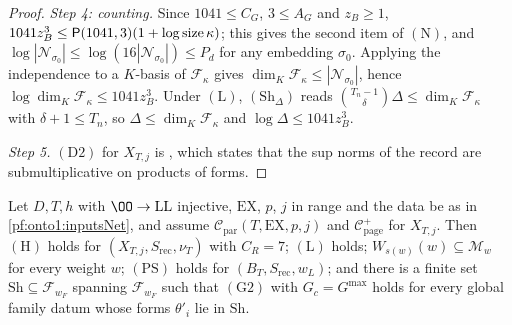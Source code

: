 \begin{proof}
\emph{Step 4: counting.} Since $1041\le C_G$, $3\le A_G$ and $z_B\ge1$, $1041z_B^3\le\mathsf{P}(1041,3)(1+\log\operatorname{size}\kappa)$; this
gives the second item of $(\mathrm N)$, and $\log|\mathcal N_{\sigma_0}|\le\log(16|\mathcal N_{\sigma_0}|)\le P_d$ for any embedding $\sigma_0$.
Applying the independence to a $K$-basis of $\mathcal F_\kappa$ gives $\dim_K\mathcal F_\kappa\le|\mathcal N_{\sigma_0}|$, hence $\log
\dim_K\mathcal F_\kappa\le1041z_B^3$. Under $(\mathrm L)$, $(\mathrm{Sh}_\Delta)$ reads $\binom{T_n-1}{\delta}\Delta\le\dim_K\mathcal F_\kappa$
with $\delta+1\le T_n$, so $\Delta\le\dim_K\mathcal F_\kappa$ and $\log\Delta\le1041z_B^3$.

\emph{Step 5.} $(\mathrm D2)$ for $X_{T,j}$ is , which states that the sup norms of the
record are submultiplicative on products of forms.
\end{proof}

\begin{theorem}\label{pf:onto1:runHyp}
Let $D,T,h$ with $\OO\to\mathrm{LL}$ injective, $\mathrm{EX}$, $p$, $j$ in range and the data be as in \cref{pf:onto1:inputsNet},
and assume $\mathcal C_{\mathrm{par}}(T,\mathrm{EX},p,j)$ and $\mathcal C^+_{\mathrm{page}}$ for $X_{T,j}$. Then $(\mathrm H)$ holds for
$(X_{T,j},S_{\mathrm{rec}},\nu_T)$ with $C_R=7$; $(\mathrm L)$ holds; $W_{s(w)}(w)\subseteq\mathcal M_w$ for every weight $w$; $(\mathrm{PS})$
holds for $(B_T,S_{\mathrm{rec}},w_L)$; and there is a finite set $\mathrm{Sh}\subseteq\mathcal F_{w_F}$ spanning $\mathcal F_{w_F}$ such that
$(\mathrm G2)$ with $G_c=G^{\max}$ holds for every global family datum whose forms $\theta'_i$ lie in $\mathrm{Sh}$.
\end{theorem}

